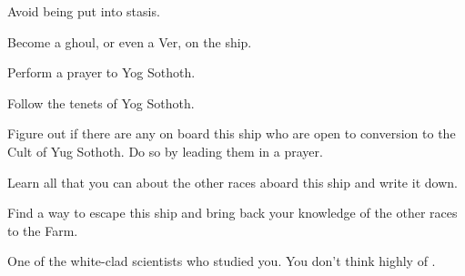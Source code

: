 \documentclass[char]{guildcamp4}
\begin{document}
\begin{itemz}[Goals]
	\item Avoid being put into stasis.
	\item Become a ghoul, or even a Ver, on the ship.
	\item Perform a prayer to Yog Sothoth.
	\item Follow the tenets of Yog Sothoth.
	\item Figure out if there are any on board this ship who are open to conversion to the Cult of Yug Sothoth. Do so by leading them in a prayer.
	\item Learn all that you can about the other races aboard this ship and write it down.
	\item Find a way to escape this ship and bring back your knowledge of the other races to the Farm.
\end{itemz}

\begin{contacts}
	\contact{\cSpite{}} One of the white-clad scientists who studied you. You don't think highly of \cSpite{\them}.
\end{contacts}
\end{document}
